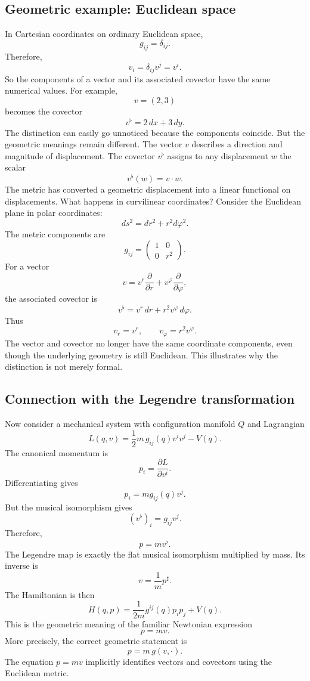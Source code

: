 \subsection{Geometric example: Euclidean space}
In Cartesian coordinates on ordinary Euclidean space,
\[
g_{ij}=\delta_{ij}.
\]
Therefore,
\[
v_i=\delta_{ij}v^j=v^i.
\]
So the components of a vector and its associated covector have the same
numerical values.
For example,
\[
v=(2,3)
\]
becomes the covector
\[
v^\flat=2\,dx+3\,dy.
\]
The distinction can easily go unnoticed because the components coincide.
But the geometric meanings remain different.
The vector \(v\) describes a direction and magnitude of displacement.
The covector \(v^\flat\) assigns to any displacement \(w\) the scalar
\[
v^\flat(w)=v\cdot w.
\]
The metric has converted a geometric displacement into a linear functional on
displacements.
What happens in curvilinear coordinates?
Consider the Euclidean plane in polar coordinates:
\[
ds^2=dr^2+r^2d\varphi^2.
\]
The metric components are
\[
g_{ij}=
\begin{pmatrix}
1&0\\
0&r^2
\end{pmatrix}.
\]
For a vector
\[
v=v^r\frac{\partial}{\partial r}
+v^\varphi\frac{\partial}{\partial\varphi},
\]
the associated covector is
\[
\boxed{
v^\flat=v^r\,dr+r^2v^\varphi\,d\varphi.
}
\]
Thus
\[
v_r=v^r,\qquad v_\varphi=r^2v^\varphi.
\]
The vector and covector no longer have the same coordinate components, even
though the underlying geometry is still Euclidean.
This illustrates why the distinction is not merely formal.

\subsection{Connection with the Legendre transformation}
Now consider a mechanical system with configuration manifold \(Q\) and
Lagrangian
\[
L(q,v)=\frac12 m\,g_{ij}(q)v^iv^j-V(q).
\]
The canonical momentum is
\[
p_i=\frac{\partial L}{\partial v^i}.
\]
Differentiating gives
\[
\boxed{p_i=mg_{ij}(q)v^j.}
\]
But the musical isomorphism gives
\[
(v^\flat)_i=g_{ij}v^j.
\]
Therefore,
\[
\boxed{p=mv^\flat.}
\]
The Legendre map is exactly the flat musical isomorphism multiplied by mass.
Its inverse is
\[
\boxed{v=\frac1m p^\sharp.}
\]
The Hamiltonian is then
\[
H(q,p)=\frac{1}{2m}g^{ij}(q)p_ip_j+V(q).
\]
This is the geometric meaning of the familiar Newtonian expression
\[
p=mv.
\]
More precisely, the correct geometric statement is
\[
\boxed{p=m\,g(v,\cdot).}
\]
The equation \(p=mv\) implicitly identifies vectors and covectors using the
Euclidean metric.

